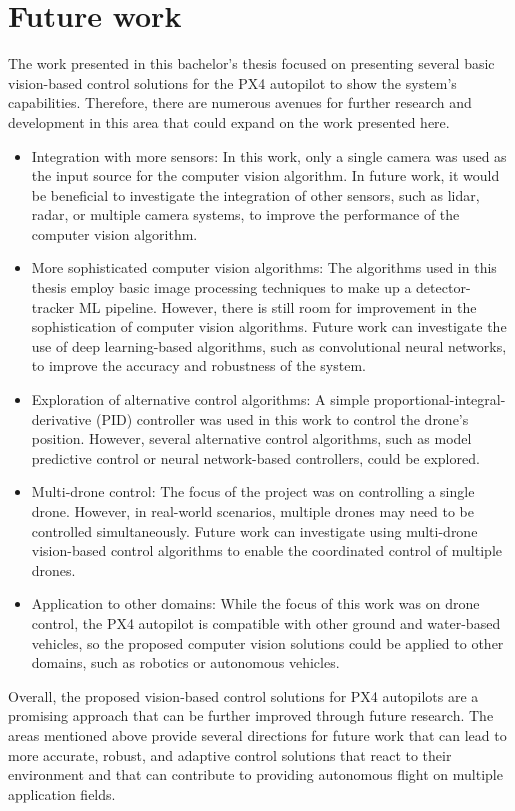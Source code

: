 \section{Future work}
\label{sec:fut-work}

The work presented in this bachelor's thesis focused on presenting several basic vision-based control solutions for the PX4 autopilot to show the system's capabilities. Therefore, there are numerous avenues for further research and development in this area that could expand on the work presented here.

\begin{itemize}
    \item Integration with more sensors: In this work, only a single camera was used as the input source for the computer vision algorithm. In future work, it would be beneficial to investigate the integration of other sensors, such as lidar, radar, or multiple camera systems, to improve the performance of the computer vision algorithm.

    \item More sophisticated computer vision algorithms: The algorithms used in this thesis employ basic image processing techniques to make up a detector-tracker ML pipeline. However, there is still room for improvement in the sophistication of computer vision algorithms. Future work can investigate the use of deep learning-based algorithms, such as convolutional neural networks, to improve the accuracy and robustness of the system.

    \item Exploration of alternative control algorithms: A simple proportional-integral-derivative (PID) controller was used in this work to control the drone's position. However, several alternative control algorithms, such as model predictive control or neural network-based controllers, could be explored.

    \item Multi-drone control: The focus of the project was on controlling a single drone. However, in real-world scenarios, multiple drones may need to be controlled simultaneously. Future work can investigate using multi-drone vision-based control algorithms to enable the coordinated control of multiple drones.

    \item Application to other domains: While the focus of this work was on drone control, the PX4 autopilot is compatible with other ground and water-based vehicles, so the proposed computer vision solutions could be applied to other domains, such as robotics or autonomous vehicles.
\end{itemize}

Overall, the proposed vision-based control solutions for PX4 autopilots are a promising approach that can be further improved through future research. The areas mentioned above provide several directions for future work that can lead to more accurate, robust, and adaptive control solutions that react to their environment and that can contribute to providing autonomous flight on multiple application fields.
